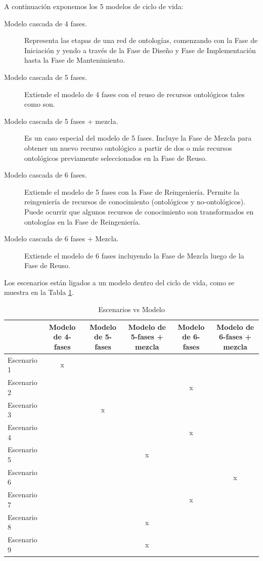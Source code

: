 A continuación exponemos los 5 modelos de ciclo de vida:	

\begin{description}
    \item[Modelo cascada de 4 fases.] Representa las etapas de una red de ontologías, comenzando con la Fase de Iniciación y yendo a través de la Fase de Diseño y Fase de Implementación hasta la Fase de Mantenimiento.
    \item[Modelo cascada de 5 fases.] Extiende el modelo de 4 fases con el reuso de recursos  ontológicos tales como son.
    \item[Modelo cascada de 5 fases + mezcla.] Es un caso especial del modelo de 5 fases. Incluye la Fase de Mezcla para obtener un nuevo recurso ontológico a partir de dos o más recursos ontológicos previamente seleccionados en la Fase de Reuso.
    \item[Modelo cascada de 6 fases.] Extiende el modelo de 5 fases con la Fase de Reingeniería. Permite la reingeniería de recursos de conocimiento (ontológicos y no-ontológicos). Puede ocurrir que algunos recursos de conocimiento son transformados en ontologías en la Fase de Reingeniería.
    \item[Modelo cascada de 6 fases + Mezcla.] Extiende el modelo de 6 fases incluyendo la Fase de Mezcla luego de la Fase de Reuso.
\end{description}

Los escenarios están ligados a un modelo dentro del ciclo de vida, como se muestra en la Tabla \ref{escenarios vs modelo}.

\begin{table}[tbp]
\centering
\caption{Escenarios vs Modelo}
\label{escenarios vs modelo}
\resizebox{15cm}{!} {
\begin{tabular}{|l|c|c|c|c|c|}
\hline
 & \multicolumn{1}{m{2cm}|}{Modelo de 4-fases} & \multicolumn{1}{m{2cm}}{Modelo de 5-fases} & \multicolumn{1}{|m{2cm}|}{Modelo de 5-fases + mezcla} & \multicolumn{1}{m{2cm}}{Modelo de 6-fases} & \multicolumn{1}{|m{2cm}|}{Modelo de 6-fases + mezcla} \\ \hline
 Escenario 1 & x & & & & \\ \hline
 Escenario 2 & & & & x & \\ \hline
 Escenario 3 & & x & & & \\ \hline
 Escenario 4 & & & & x & \\ \hline
 Escenario 5 & & & x & & \\ \hline
 Escenario 6 & & & & & x \\ \hline
 Escenario 7 & & & & x & \\ \hline
 Escenario 8 & & & x & & \\ \hline
 Escenario 9 & & & x & & \\ \hline
\end{tabular}
}
\end{table}

